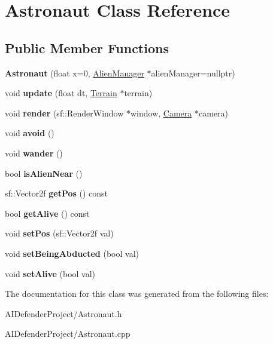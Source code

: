 \hypertarget{class_astronaut}{}\section{Astronaut Class Reference}
\label{class_astronaut}
\subsection*{Public Member Functions}
\begin{DoxyCompactItemize}
\item 
\mbox{\label{class_astronaut_a614b65279635ce7d565fd38d7f8a23a9}} 
{\bfseries Astronaut} (float x=0, \hyperlink{class_alien_manager}{Alien\+Manager} $\ast$alien\+Manager=nullptr)
\item 
\mbox{\label{class_astronaut_a4f11ba0fed0d53f93e8c8298bed274bd}} 
void {\bfseries update} (float dt, \hyperlink{class_terrain}{Terrain} $\ast$terrain)
\item 
\mbox{\label{class_astronaut_aac035dcb12e48dd073057fb84e9b838e}} 
void {\bfseries render} (sf\+::\+Render\+Window $\ast$window, \hyperlink{class_camera}{Camera} $\ast$camera)
\item 
\mbox{\label{class_astronaut_a86023466ed8a021f668c68fc10f778b0}} 
void {\bfseries avoid} ()
\item 
\mbox{\label{class_astronaut_a39d7e43f8604bf561570e2eb2564a8fa}} 
void {\bfseries wander} ()
\item 
\mbox{\label{class_astronaut_a1699b7aa32a145afbf52166453a4978f}} 
bool {\bfseries is\+Alien\+Near} ()
\item 
\mbox{\label{class_astronaut_a0ff0404afaa68a7f997f06c2b31da64d}} 
sf\+::\+Vector2f {\bfseries get\+Pos} () const
\item 
\mbox{\label{class_astronaut_a846e03bbd9c74739f9943fcccc9c9256}} 
bool {\bfseries get\+Alive} () const
\item 
\mbox{\label{class_astronaut_a958f10e0ab8eaacd9317012c6b0a7cba}} 
void {\bfseries set\+Pos} (sf\+::\+Vector2f val)
\item 
\mbox{\label{class_astronaut_a383b5caca9e2d81a987211eeffec2962}} 
void {\bfseries set\+Being\+Abducted} (bool val)
\item 
\mbox{\label{class_astronaut_aed00a217278aeec62252b906f87a4bd0}} 
void {\bfseries set\+Alive} (bool val)
\end{DoxyCompactItemize}


The documentation for this class was generated from the following files\+:\begin{DoxyCompactItemize}
\item 
A\+I\+Defender\+Project/Astronaut.\+h\item 
A\+I\+Defender\+Project/Astronaut.\+cpp\end{DoxyCompactItemize}
